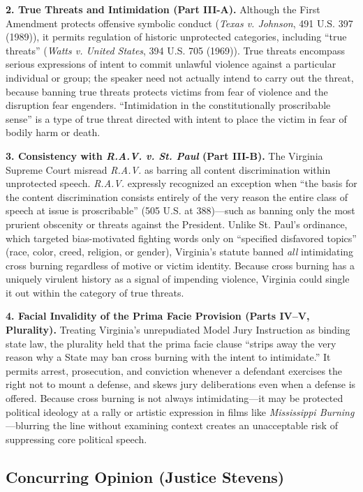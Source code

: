 \documentclass[12pt]{article}
\begin{document}
\textbf{2. True Threats and Intimidation (Part III-A).} Although the First Amendment protects offensive symbolic conduct (\textit{Texas v. Johnson}, 491 U.S. 397 (1989)), it permits regulation of historic unprotected categories, including ``true threats'' (\textit{Watts v. United States}, 394 U.S. 705 (1969)). True threats encompass serious expressions of intent to commit unlawful violence against a particular individual or group; the speaker need not actually intend to carry out the threat, because banning true threats protects victims from fear of violence and the disruption fear engenders. ``Intimidation in the constitutionally proscribable sense'' is a type of true threat directed with intent to place the victim in fear of bodily harm or death.

\textbf{3. Consistency with \textit{R.A.V. v. St. Paul} (Part III-B).} The Virginia Supreme Court misread \textit{R.A.V.} as barring all content discrimination within unprotected speech. \textit{R.A.V.} expressly recognized an exception when ``the basis for the content discrimination consists entirely of the very reason the entire class of speech at issue is proscribable'' (505 U.S. at 388)---such as banning only the most prurient obscenity or threats against the President. Unlike St. Paul's ordinance, which targeted bias-motivated fighting words only on ``specified disfavored topics'' (race, color, creed, religion, or gender), Virginia's statute banned \textit{all} intimidating cross burning regardless of motive or victim identity. Because cross burning has a uniquely virulent history as a signal of impending violence, Virginia could single it out within the category of true threats.

\textbf{4. Facial Invalidity of the Prima Facie Provision (Parts IV--V, Plurality).} Treating Virginia's unrepudiated Model Jury Instruction as binding state law, the plurality held that the prima facie clause ``strips away the very reason why a State may ban cross burning with the intent to intimidate.'' It permits arrest, prosecution, and conviction whenever a defendant exercises the right not to mount a defense, and skews jury deliberations even when a defense is offered. Because cross burning is not always intimidating---it may be protected political ideology at a rally or artistic expression in films like \textit{Mississippi Burning}---blurring the line without examining context creates an unacceptable risk of suppressing core political speech.

\subsection{Concurring Opinion (Justice Stevens)}
\end{document}
